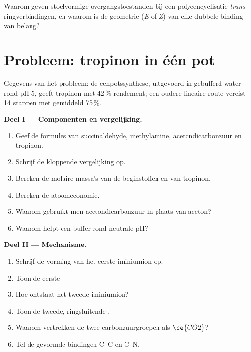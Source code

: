\begin{exercise}[$\star\star\star$]\label{exo:b3:total-synthesis:12}
Waarom geven stoelvormige overgangstoestanden bij een
polyeencyclisatie \textit{trans}-ringverbindingen, en waarom is de geometrie (\textit{E} of \textit{Z}) van elke dubbele binding van belang?
\end{exercise}

\section{Probleem: tropinon in één pot}

\begin{problem}
\label{pb:b3:total-synthesis:1}
Gegevens van het probleem: de eenpotssynthese, uitgevoerd in gebufferd
water rond pH 5, geeft tropinon met 42\,\% rendement; een oudere lineaire
route vereist 14 stappen met gemiddeld 75\,\%.

\medskip\noindent\textbf{Deel I --- Componenten en vergelijking.}
\begin{enumerate}
  \item Geef de formules van succinaldehyde, methylamine,
        acetondicarbonzuur en tropinon.
  \item Schrijf de kloppende vergelijking op.
  \item Bereken de molaire massa's van de beginstoffen en van tropinon.
  \item Bereken de atoomeconomie.
  \item Waarom gebruikt men acetondicarbonzuur in plaats van aceton?
  \item Waarom helpt een buffer rond neutrale pH?
\end{enumerate}

\medskip\noindent\textbf{Deel II --- Mechanisme.}
\begin{enumerate}[resume]
  \item Schrijf de vorming van het eerste iminiumion op.
  \item Toon de eerste .
  \item Hoe ontstaat het tweede iminiumion?
  \item Toon de tweede, ringsluitende .
  \item Waarom vertrekken de twee carbonzuurgroepen als $\ce{CO2}$?
  \item Tel de gevormde bindingen C--C en C--N.
\end{enumerate}


\end{problem}
